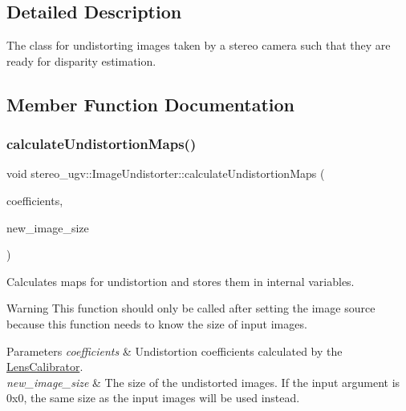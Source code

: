 \subsection{Detailed Description}
The class for undistorting images taken by a stereo camera such that they are ready for disparity estimation. 

\subsection{Member Function Documentation}
\mbox{\label{classstereo__ugv_1_1ImageUndistorter_a6351c3b0ff279c72e903fa1bde8400d7}} 
\subsubsection{\texorpdfstring{calculate\+Undistortion\+Maps()}{calculateUndistortionMaps()}}
{\footnotesize\ttfamily void stereo\+\_\+ugv\+::\+Image\+Undistorter\+::calculate\+Undistortion\+Maps (\begin{DoxyParamCaption}\item[{const \hyperlink{structstereo__ugv_1_1LensCoefficients}{Lens\+Coefficients} \&}]{coefficients,  }\item[{cv\+::\+Size}]{new\+\_\+image\+\_\+size }\end{DoxyParamCaption})}



Calculates maps for undistortion and stores them in internal variables. 

\begin{DoxyWarning}{Warning}
This function should only be called after setting the image source because this function needs to know the size of input images. 
\end{DoxyWarning}

\begin{DoxyParams}{Parameters}
{\em coefficients} & Undistortion coefficients calculated by the \hyperlink{classstereo__ugv_1_1LensCalibrator}{Lens\+Calibrator}. \\
\hline
{\em new\+\_\+image\+\_\+size} & The size of the undistorted images. If the input argument is 0x0, the same size as the input images will be used instead. \\
\hline
\end{DoxyParams}
\mbox{\label{classstereo__ugv_1_1ImageUndistorter_aef84d98cbcfc32fcdd725a7c3bcebf72}} 
